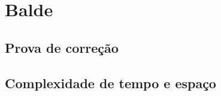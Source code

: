\section{Balde}
\lipsum[21]



\subsection{Prova de correção}
\lipsum[19]

\subsection{Complexidade de tempo e espaço}
\lipsum[19]